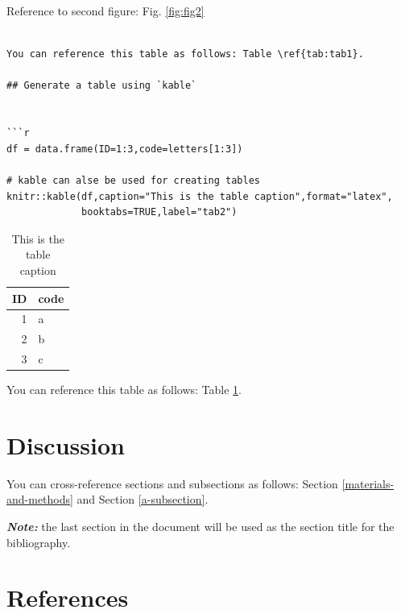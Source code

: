 \documentclass[12pt,halfline,a4paper,]{ouparticle}
\begin{document}
Reference to second figure: Fig. \ref{fig:fig2}

\begin{verbatim}

You can reference this table as follows: Table \ref{tab:tab1}.

## Generate a table using `kable`


```r
df = data.frame(ID=1:3,code=letters[1:3])

# kable can alse be used for creating tables
knitr::kable(df,caption="This is the table caption",format="latex",
             booktabs=TRUE,label="tab2")
\end{verbatim}

\begin{table}

\caption{\label{tab:tab2}This is the table caption}
\centering
\begin{tabular}[t]{rl}
\toprule
ID & code\\
\midrule
1 & a\\
2 & b\\
3 & c\\
\bottomrule
\end{tabular}
\end{table}

You can reference this table as follows: Table \ref{tab:tab2}.

\hypertarget{discussion}{%
\section{Discussion}\label{discussion}}

You can cross-reference sections and subsections as follows: Section
\ref{materials-and-methods} and Section \ref{a-subsection}.

\textbf{\emph{Note:}} the last section in the document will be used as
the section title for the bibliography.

\hypertarget{references}{%
\section{References}\label{references}}
\end{document}
